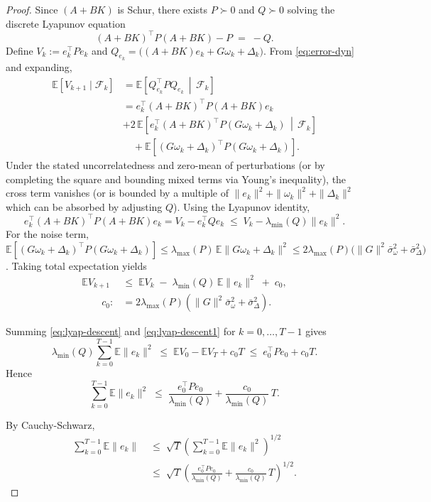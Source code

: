 \documentclass[journal]{IEEEtran}
\theoremstyle{definition}
\begin{document}
\begin{proof}
 
Since $(A{+}BK)$ is Schur, there exists $P\succ 0$ and $Q\succ 0$ solving the discrete Lyapunov
equation
\[
(A{+}BK)^\top P (A{+}BK) - P \;=\; -Q.
\]
Define $V_k:=e_k^\top P e_k$ and $Q_{e_k} =\big((A{+}BK)e_k+G\omega_k+\Delta_k\big)$. From \eqref{eq:error-dyn} and expanding,
\begin{align*}
\mathbb{E}[V_{k+1}\mid \mathcal{F}_k]
&= \mathbb{E}\!\left[Q_{e_k}^\top
PQ_{e_k}\,\middle|\,\mathcal{F}_k\right]\\
&= e_k^\top (A{+}BK)^\top P (A{+}BK) e_k\\
  &+ 2\,\mathbb{E}\!\left[e_k^\top (A{+}BK)^\top P (G\omega_k{+}\Delta_k)\,\middle|\,\mathcal{F}_k\right]\\
&\quad + \mathbb{E}\!\left[(G\omega_k{+}\Delta_k)^\top P (G\omega_k{+}\Delta_k)\right].
\end{align*}
Under the stated uncorrelatedness and zero-mean of perturbations (or by completing the square and
bounding mixed terms via Young's inequality), the cross term vanishes (or is bounded by a multiple
of $\|e_k\|^2+\|\omega_k\|^2+\|\Delta_k\|^2$ which can be absorbed by adjusting $Q$).
Using the Lyapunov identity,
\[
e_k^\top (A{+}BK)^\top P (A{+}BK) e_k
= V_k - e_k^\top Q e_k \;\le\; V_k - \lambda_{\min}(Q)\|e_k\|^2.
\]
For the noise term, $\mathbb{E}[(G\omega_k{+}\Delta_k)^\top P (G\omega_k{+}\Delta_k)]
\le \lambda_{\max}(P)\,\mathbb{E}\|G\omega_k{+}\Delta_k\|^2
\le 2\lambda_{\max}(P)\big(\|G\|^2\bar\sigma_\omega^2 + \bar\sigma_\Delta^2\big)$.
Taking total expectation yields
\begin{align}
\mathbb{E}V_{k+1} \;&\le\; \mathbb{E}V_k \;-\; \lambda_{\min}(Q)\,\mathbb{E}\|e_k\|^2
\;+\; c_0,\label{eq:lyap-descent1}\\
\qquad
c_0:&=2\lambda_{\max}(P)(\|G\|^2\bar\sigma_\omega^2+\bar\sigma_\Delta^2).
\label{eq:lyap-descent}
\end{align}

 
Summing \eqref{eq:lyap-descent} and  \eqref{eq:lyap-descent1} for $k=0,\dots,T-1$ gives
\[
\lambda_{\min}(Q)\sum_{k=0}^{T-1}\mathbb{E}\|e_k\|^2
\;\le\; \mathbb{E}V_0 - \mathbb{E}V_T + c_0 T
\;\le\; e_0^\top P e_0 + c_0 T.
\]
Hence
\begin{equation}
\sum_{k=0}^{T-1}\mathbb{E}\|e_k\|^2
\;\le\; \frac{e_0^\top P e_0}{\lambda_{\min}(Q)} + \frac{c_0}{\lambda_{\min}(Q)}\,T.
\label{eq:second-moment-sum}
\end{equation}

 
By Cauchy-Schwarz,
\begin{align*}
\sum_{k=0}^{T-1}\mathbb{E}\|e_k\|
\;&\le\; \sqrt{T}\left(\sum_{k=0}^{T-1}\mathbb{E}\|e_k\|^2\right)^{1/2}\\
\;&\le\; \sqrt{T}\left(\frac{e_0^\top P e_0}{\lambda_{\min}(Q)} + \frac{c_0}{\lambda_{\min}(Q)}\,T\right)^{1/2}.
\end{align*}
 

\end{proof}
\end{document}
